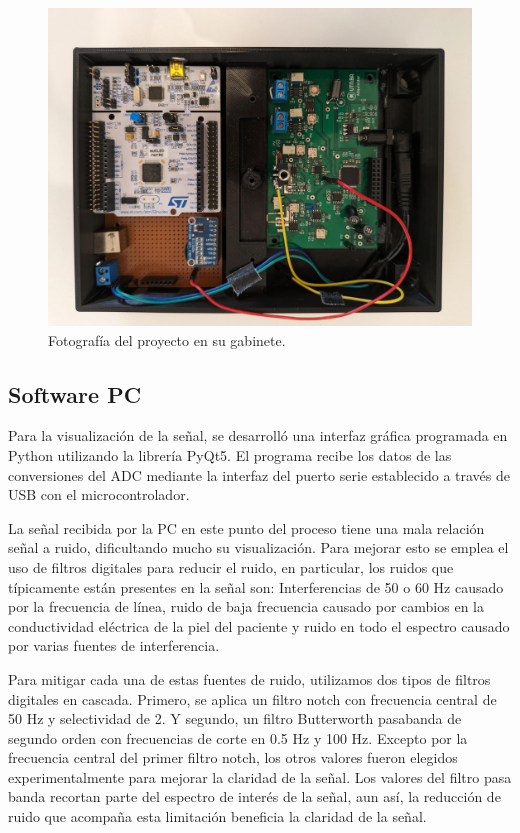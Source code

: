 \documentclass[conference]{IEEEtran}
\begin{document}
\begin{figure}[hb]
    \centerline{\includegraphics[width=\linewidth]{figs/foto_proyecto.jpeg}}
    \caption{Fotografía del proyecto en su gabinete.}
    \label{fig:foto_proyecto}
    \end{figure}

\subsection{Software PC}\label{software-pc}

Para la visualización de la señal, se desarrolló una interfaz gráfica programada
en Python utilizando la librería PyQt5. \cite{pyqt5} El programa recibe los datos de las
conversiones del ADC mediante la interfaz del puerto serie establecido a través de
USB con el microcontrolador.

La señal recibida por la PC en este punto del proceso tiene una mala relación señal a
ruido, dificultando mucho su visualización. Para mejorar esto se emplea el uso de
filtros digitales para reducir el ruido, en particular, los ruidos que típicamente
están presentes en la señal son: Interferencias de 50 o 60 Hz causado por la
frecuencia de línea, ruido de baja frecuencia causado por cambios en la conductividad
eléctrica de la piel del paciente y ruido en todo el espectro causado por varias
fuentes de interferencia.

Para mitigar cada una de estas fuentes de ruido, utilizamos dos tipos de filtros
digitales en cascada. Primero, se aplica un filtro notch con frecuencia central de
50 Hz y selectividad de 2. Y segundo, un filtro Butterworth pasabanda de segundo
orden con frecuencias de corte en 0.5 Hz y 100 Hz. Excepto por la frecuencia central
del primer filtro notch, los otros valores fueron elegidos experimentalmente para
mejorar la claridad de la señal. Los valores del filtro pasa banda recortan parte
del espectro de interés de la señal, aun así, la reducción de ruido que acompaña
esta limitación beneficia la claridad de la señal.
\end{document}
